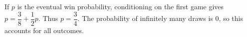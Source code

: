 If $p$ is the eventual win probability, conditioning on the first game gives $p=\dfrac{3}{8}+\dfrac{1}{2}p$. Thus $\boxed{p=\dfrac{3}{4}}$. The probability of infinitely many draws is 0, so this accounts for all outcomes.
